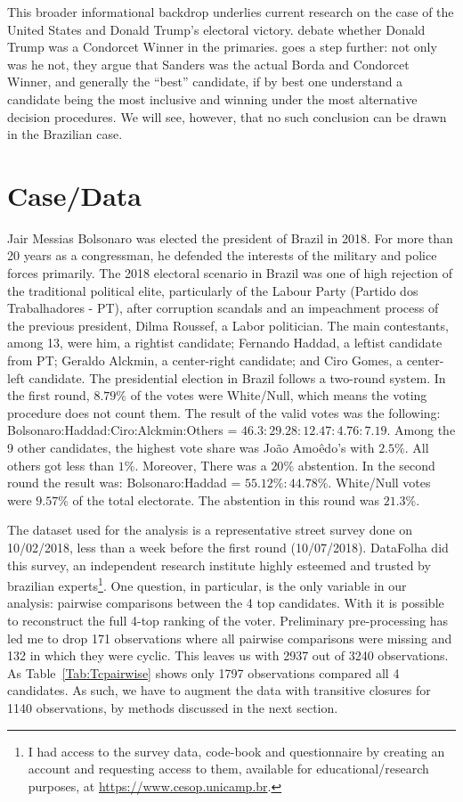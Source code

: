 \documentclass[hidelinks,11pt]{article}
\begin{document}
This broader informational backdrop underlies current research on the case of
the United States and Donald Trump's electoral victory. \textcite{potthoff2021condorcet, woon2020trump, kurrild2018trump} debate whether Donald Trump was a  Condorcet Winner in the primaries.  \textcite{igersheim22_compar_votin_method} goes a step further: not only was he not, they argue that Sanders was the actual Borda and Condorcet Winner, and generally the ``best'' candidate, if by best one understand a candidate being the most inclusive and winning under the most alternative decision procedures. We will see, however, that no such conclusion can be drawn in the Brazilian case.


\section{Case/Data}


Jair Messias Bolsonaro was elected the president of Brazil in 2018. For more
than 20 years as a congressman, he defended the interests of the
military and police forces primarily. The 2018 electoral scenario in Brazil was one of
high rejection of the traditional political elite, particularly of the Labour
Party (Partido dos Trabalhadores - PT), after corruption scandals and an
impeachment process of the previous president, Dilma Roussef, a Labor
politician. The main contestants, among 13, were him, a rightist candidate;
Fernando Haddad, a leftist candidate from PT; Geraldo Alckmin, a center-right
candidate; and Ciro Gomes, a center-left candidate. The presidential election in
Brazil follows a two-round system. In the first round,  \(8.79\%\) of the votes were White/Null, which means the voting procedure does not count them. The result of the valid votes
was the following: Bolsonaro:Haddad:Ciro:Alckmin:Others =
\(46.3:29.28:12.47:4.76:7.19 \). Among the 9 other candidates, the highest vote
share was João Amoêdo's with \(2.5\%\). All others got less than \(1\%\).
Moreover,  There was a \(20\%\) abstention. In the second
round the result was: Bolsonaro:Haddad = \(55.12\% : 44.78\% \). White/Null
votes were \(9.57\%\) of the total electorate. The abstention in this round was
\(21.3\%\).


The dataset used for the analysis is a representative street survey done on
10/02/2018, less than a week before the first round (10/07/2018). DataFolha did this survey, an independent research institute highly esteemed and
trusted by brazilian experts\footnote{I had access to the survey data, code-book and
  questionnaire by creating an account and requesting access to them,
  available for educational/research purposes, at
  \url{https://www.cesop.unicamp.br}.}. One question, in particular, is the only
variable in our analysis: pairwise comparisons between the 4 top candidates.
With it is possible to reconstruct the full 4-top ranking of the voter.
Preliminary pre-processing has led me to drop 171 observations where all
pairwise comparisons were missing and 132 in which they were cyclic. This leaves
us with 2937 out of 3240 observations. As Table~\ref{Tab:Tcpairwise} shows only
1797 observations compared all 4 candidates. As such, we have to augment the
data with transitive closures for 1140 observations, by methods discussed in the
next section.
\end{document}
